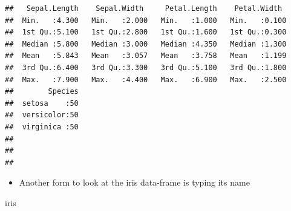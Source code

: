 \documentclass[
]{book}
\newenvironment{Shaded}{\begin{snugshade}}{\end{snugshade}}
\newcommand{\NormalTok}[1]{#1}
\providecommand{\tightlist}{%
  \setlength{\itemsep}{0pt}\setlength{\parskip}{0pt}}
\begin{document}
\begin{verbatim}
##   Sepal.Length    Sepal.Width     Petal.Length    Petal.Width   
##  Min.   :4.300   Min.   :2.000   Min.   :1.000   Min.   :0.100  
##  1st Qu.:5.100   1st Qu.:2.800   1st Qu.:1.600   1st Qu.:0.300  
##  Median :5.800   Median :3.000   Median :4.350   Median :1.300  
##  Mean   :5.843   Mean   :3.057   Mean   :3.758   Mean   :1.199  
##  3rd Qu.:6.400   3rd Qu.:3.300   3rd Qu.:5.100   3rd Qu.:1.800  
##  Max.   :7.900   Max.   :4.400   Max.   :6.900   Max.   :2.500  
##        Species  
##  setosa    :50  
##  versicolor:50  
##  virginica :50  
##                 
##                 
## 
\end{verbatim}

\begin{itemize}
\tightlist
\item
  Another form to look at the iris data-frame is typing its name
\end{itemize}

\begin{Shaded}
\begin{Highlighting}[]
\NormalTok{iris}
\end{Highlighting}
\end{Shaded}
\end{document}
